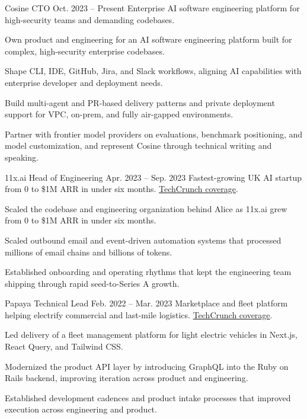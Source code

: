 
\ResumeJob
  {Cosine}
  {CTO}
  {Oct. 2023 -- Present}
  {Enterprise AI software engineering platform for high-security teams and demanding codebases.}
\begin{ResumeList}
  \item Own product and engineering for an AI software engineering platform built for complex, high-security enterprise codebases.
  \item Shape CLI, IDE, GitHub, Jira, and Slack workflows, aligning AI capabilities with enterprise developer and deployment needs.
  \item Build multi-agent and PR-based delivery patterns and private deployment support for VPC, on-prem, and fully air-gapped environments.
  \item Partner with frontier model providers on evaluations, benchmark positioning, and model customization, and represent Cosine through technical writing and speaking.
\end{ResumeList}

\ResumeJob
  {11x.ai}
  {Head of Engineering}
  {Apr. 2023 -- Sep. 2023}
  {Fastest-growing UK AI startup from 0 to \$1M ARR in under six months. \href{https://techcrunch.com/2023/08/11/11xai-closes-2-million-pre-seed-to-create-autonomous-ai-workers/}{TechCrunch coverage}.}
\begin{ResumeList}
  \item Scaled the codebase and engineering organization behind Alice as 11x.ai grew from 0 to \$1M ARR in under six months.
  \item Scaled outbound email and event-driven automation systems that processed millions of email chains and billions of tokens.
  \item Established onboarding and operating rhythms that kept the engineering team shipping through rapid seed-to-Series A growth.
\end{ResumeList}

\ResumeJob
  {Papaya}
  {Technical Lead}
  {Feb. 2022 -- Mar. 2023}
  {Marketplace and fleet platform helping electrify commercial and last-mile logistics. \href{https://techcrunch.com/2022/09/27/papaya-wants-to-help-electrify-last-mile-logistics-in-europe/}{TechCrunch coverage}.}
\begin{ResumeList}
  \item Led delivery of a fleet management platform for light electric vehicles in Next.js, React Query, and Tailwind CSS.
  \item Modernized the product API layer by introducing GraphQL into the Ruby on Rails backend, improving iteration across product and engineering.
  \item Established development cadences and product intake processes that improved execution across engineering and product.
\end{ResumeList}

